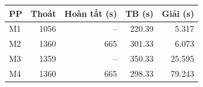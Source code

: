 \begin{center}\small
\begin{tabular}{lrrrr}
\toprule
PP & Thoát & Hoàn tất (s) & TB (s) & Giải (s)\\\midrule
M1 & 1056 & -- & 220.39 & 5.317\\
M2 & 1360 & 665 & 301.33 & 6.073\\
M3 & 1359 & -- & 350.33 & 25.595\\
M4 & 1360 & 665 & 298.33 & 79.243\\
\bottomrule\end{tabular}\end{center}